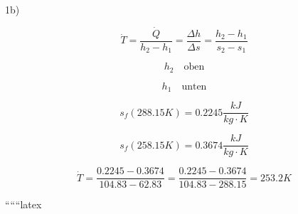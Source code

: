 1b)

\[
\dot{T} = \frac{\dot{Q}}{h_2 - h_1} = \frac{\Delta h}{\Delta s} = \frac{h_2 - h_1}{s_2 - s_1}
\]

\[
h_2 \quad \text{oben}
\]

\[
h_1 \quad \text{unten}
\]

\[
s_f (288.15 K) = 0.2245 \frac{kJ}{kg \cdot K}
\]

\[
s_f (258.15 K) = 0.3674 \frac{kJ}{kg \cdot K}
\]

\[
\dot{T} = \frac{0.2245 - 0.3674}{104.83 - 62.83} = \frac{0.2245 - 0.3674}{104.83 - 288.15} = 253.2 K
\]

``````latex